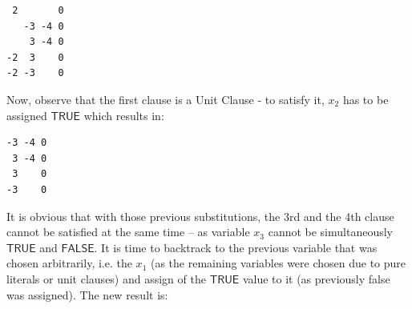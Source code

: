 \documentclass[12pt,english,pdflatex]{aghdpl}
\begin{document}
\begin{lstlisting}
 2       0
   -3 -4 0
    3 -4 0
-2  3    0
-2 -3    0
\end{lstlisting}
Now, observe that the  first clause is a Unit Clause - to satisfy it, $x_2$
has to be assigned $\mathsf{TRUE}$ which results in:

\begin{lstlisting}
-3 -4 0
 3 -4 0
 3    0
-3    0
\end{lstlisting}
It is obvious that with those previous substitutions, the 3rd and the 4th
clause cannot be satisfied at the same time -- as variable $x_3$ cannot
be simultaneously $\mathsf{TRUE}$ and $\mathsf{FALSE}$. It is time to backtrack to the
previous variable that was chosen arbitrarily, i.e. the $x_1$
(as the remaining variables were chosen due to pure literals or unit
clauses) and assign of the  $\mathsf{TRUE}$ value to it (as previously false was assigned). The new result is:
\end{document}
